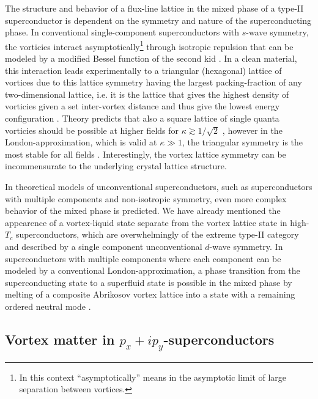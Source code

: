 The structure and behavior of a flux-line lattice in the mixed phase of a type-II superconductor is dependent on the symmetry and nature of the superconducting phase. In conventional single-component
superconductors with $s$-wave symmetry, the vorticies interact asymptotically\footnote{In this context ``asymptotically'' means in the asymptotic limit of large separation between vortices.}
through isotropic repulsion that can be modeled by a modified Bessel function of the second kid \cite{Abrikosov56,Kramer71,Chaves11}. In a clean material, this interaction leads experimentally
to a triangular (hexagonal) lattice of vortices due to this lattice symmetry having the largest packing-fraction of any
two-dimensional lattice, i.e. it is the lattice that gives the highest density of vorticies given a set inter-vortex distance and thus give the lowest energy configuration \cite{Cribier66,Essmann67}.
Theory predicts that also a square lattice of single quanta vorticies should be possible at higher fields for $\kappa \gtrsim 1/\sqrt{2}$ \cite{Kramer71}, however in the London-approximation,
which is valid at $\kappa\gg1$, the triangular symmetry is the most stable for all fields \cite{Matricon64}.
Interestingly, the vortex lattice symmetry can be incommensurate to the underlying crystal lattice structure.

In theoretical models of unconventional superconductors, such as superconductors with multiple components and non-isotropic symmetry, even more complex behavior of the mixed phase is predicted.
We have already mentioned the appearence of a vortex-liquid state separate from the vortex lattice state in high-$T_c$ superconductors, which are overwhelmingly of the extreme type-II category
and described by a single component unconventional $d$-wave symmetry.
In superconductors with multiple components where each component can be modeled by a conventional London-approximation, a phase transition from the superconducting state to a superfluid state is possible
in the mixed phase by melting of a composite Abrikosov vortex lattice into a state with a remaining ordered neutral mode \cite{Smiseth05}.

\subsection{Vortex matter in $p_x+ip_y$-superconductors}

